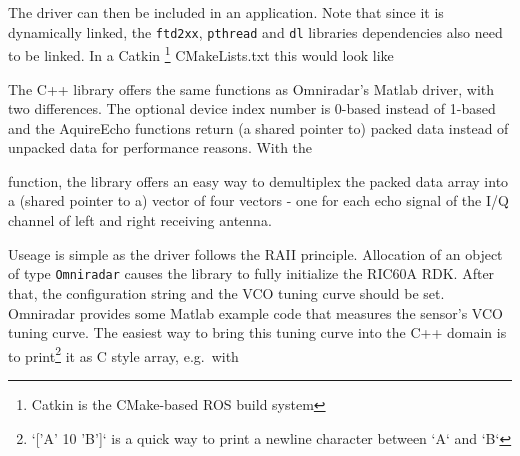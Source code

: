 The driver can then be included in an application. Note that since it is
dynamically linked, the \texttt{ftd2xx}, \texttt{pthread} and
\texttt{dl} libraries dependencies also need to be linked. In a Catkin
\footnote{Catkin is the CMake-based ROS build system} CMakeLists.txt
this would look like

\begin{Shaded}
\begin{Highlighting}[]
\NormalTok{(}
\NormalTok{)}
\end{Highlighting}
\end{Shaded}

The C++ library offers the same functions as Omniradar's Matlab driver,
with two differences. The optional device index number is 0-based
instead of 1-based and the AquireEcho functions return (a shared pointer
to) packed data instead of unpacked data for performance reasons. With
the

\begin{Shaded}
\begin{Highlighting}[]
 
\end{Highlighting}
\end{Shaded}

function, the library offers an easy way to demultiplex the packed data
array into a (shared pointer to a) vector of four vectors - one for each
echo signal of the I/Q channel of left and right receiving antenna.

Useage is simple as the driver follows the RAII principle. Allocation of
an object of type \texttt{Omniradar} causes the library to fully
initialize the RIC60A RDK. After that, the configuration string and the
VCO tuning curve should be set. Omniradar provides some Matlab example
code that measures the sensor's VCO tuning curve. The easiest way to
bring this tuning curve into the C++ domain is to
print\footnote{`['A' 10 'B']` is a quick way to print a newline character between `A` and `B`}
it as C style array, e.g.~with

\begin{Shaded}
\begin{Highlighting}[]
\NormalTok{[}    \NormalTok{]}
\end{Highlighting}
\end{Shaded}

